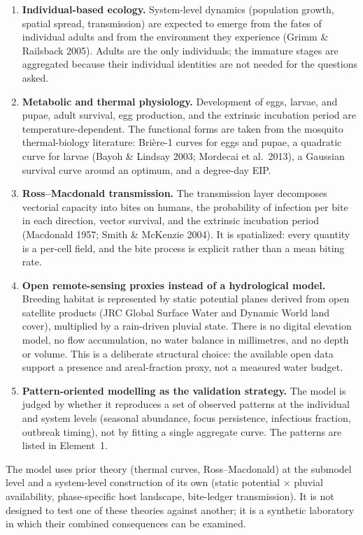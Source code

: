 \documentclass[11pt,a4paper]{article}
\begin{document}
\begin{enumerate}
\item \textbf{Individual-based ecology.} System-level dynamics (population
  growth, spatial spread, transmission) are expected to emerge from the
  fates of individual adults and from the environment they experience
  (Grimm \& Railsback 2005). Adults are the only individuals; the
  immature stages are aggregated because their individual identities are
  not needed for the questions asked.
\item \textbf{Metabolic and thermal physiology.} Development of eggs,
  larvae, and pupae, adult survival, egg production, and the extrinsic
  incubation period are temperature-dependent. The functional forms are
  taken from the mosquito thermal-biology literature: Brière-1 curves for
  eggs and pupae, a quadratic curve for larvae (Bayoh \& Lindsay 2003;
  Mordecai et al.\ 2013), a Gaussian survival curve around an optimum,
  and a degree-day EIP.
\item \textbf{Ross--Macdonald transmission.} The transmission layer
  decomposes vectorial capacity into bites on humans, the probability of
  infection per bite in each direction, vector survival, and the
  extrinsic incubation period (Macdonald 1957; Smith \& McKenzie 2004).
  It is spatialized: every quantity is a per-cell field, and the bite
  process is explicit rather than a mean biting rate.
\item \textbf{Open remote-sensing proxies instead of a hydrological
  model.} Breeding habitat is represented by static potential planes
  derived from open satellite products (JRC Global Surface Water and
  Dynamic World land cover), multiplied by a rain-driven pluvial state.
  There is no digital elevation model, no flow accumulation, no water
  balance in millimetres, and no depth or volume. This is a deliberate
  structural choice: the available open data support a presence and
  areal-fraction proxy, not a measured water budget.
\item \textbf{Pattern-oriented modelling as the validation strategy.} The
  model is judged by whether it reproduces a set of observed patterns at
  the individual and system levels (seasonal abundance, focus
  persistence, infectious fraction, outbreak timing), not by fitting a
  single aggregate curve. The patterns are listed in Element~1.
\end{enumerate}

The model uses prior theory (thermal curves, Ross--Macdonald) at the
submodel level and a system-level construction of its own (static
potential $\times$ pluvial availability, phase-specific host landscape,
bite-ledger transmission). It is not designed to test one of these
theories against another; it is a synthetic laboratory in which their
combined consequences can be examined.
\end{document}
